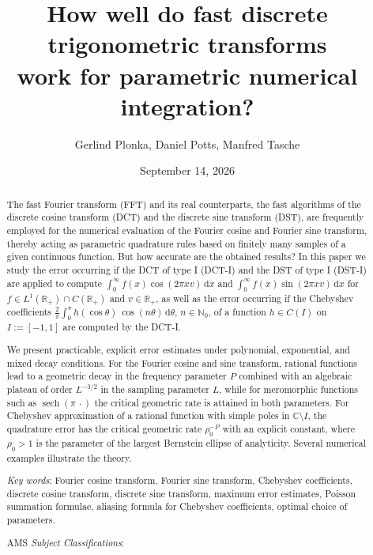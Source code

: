 \documentclass[11pt,a4paper]{scrartcl}
\title{How well do fast discrete trigonometric transforms\\ work for parametric numerical integration?}
\date{September 14, 2026}
\author{Gerlind Plonka\footnotemark[1], Daniel Potts\footnotemark[2], Manfred Tasche\footnotemark[3]}
\renewcommand{\d}{\,\mathrm{d}}
\numberwithin{equation}{section}
\numberwithin{table}{section}
\numberwithin{figure}{section}
\newcommand{\C}{\mathbb C}
\newcommand{\Rp}{{\mathbb R}_{+}}
\newcommand{\Np}{{\mathbb N}_0}
\begin{document}
	
\maketitle


\begin{abstract}
The fast Fourier transform (FFT) and its real counterparts, the fast algorithms of the discrete
cosine transform (DCT) and the discrete sine transform (DST), are frequently employed for the
numerical evaluation of the Fourier cosine and Fourier sine transform, thereby acting as parametric
quadrature rules based on finitely many samples of a given continuous function. But how accurate
are the obtained results? In this paper we study the error occurring if the DCT of type I (DCT-I)
and the DST of type I (DST-I) are applied to compute
$\int_0^{\infty} f(x)\cos(2\pi xv)\d x$ and $\int_0^{\infty} f(x)\sin(2\pi xv)\d x$
for $f \in L^1(\Rp) \cap C(\Rp)$ and $v \in \Rp$, as well as the error occurring if the Chebyshev
coefficients $\frac{2}{\pi}\int_0^{\pi} h(\cos\theta)\,\cos(n\theta)\d\theta$, $n \in \Np$, of a
function $h \in C(I)$ on $I := [-1,1]$ are computed by the DCT-I.

We present practicable, explicit error estimates under polynomial, exponential, and mixed decay
conditions. For the Fourier cosine and sine transform, rational functions lead to a geometric decay
in the frequency parameter $P$ combined with an algebraic plateau of order $L^{-3/2}$ in the
sampling parameter $L$, while for meromorphic functions such as $\operatorname{sech}(\pi\,\cdot)$
the critical geometric rate is attained in both parameters. For Chebyshev approximation of a
rational function with simple poles in $\C \setminus I$, the quadrature error has the critical
geometric rate $\rho_0^{-P}$ with an explicit constant, where $\rho_0 > 1$ is the parameter
of the largest Bernstein ellipse of analyticity. Several numerical
examples illustrate the theory.
\medskip

\noindent\emph{Key words}: Fourier cosine transform, Fourier sine transform, Chebyshev
coefficients, discrete cosine transform, discrete sine transform, maximum error estimates, Poisson
summation formulae, aliasing formula for Chebyshev coefficients, optimal choice of parameters.
\smallskip

\noindent AMS \emph{Subject Classifications}: 
\end{abstract}
\end{document}
